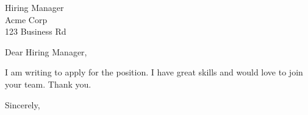 \documentclass[11pt,a4paper]{letter}
\begin{document}
\begin{letter}{
    Hiring Manager\\
    Acme Corp\\
    123 Business Rd
}

\opening{Dear Hiring Manager,}

I am writing to apply for the position. I have great skills and would love to join your team. Thank you.

\closing{Sincerely,}

\end{letter}
\end{document}
